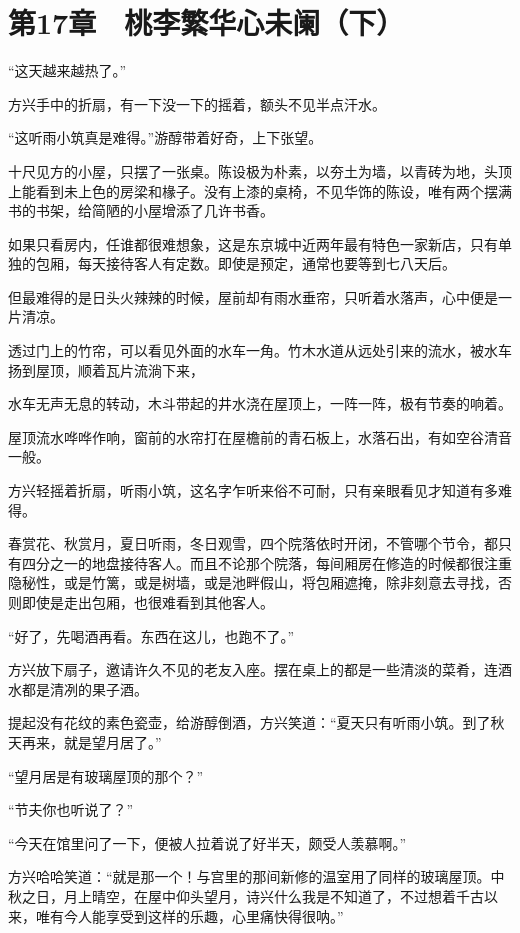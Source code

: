 \section{第17章　桃李繁华心未阑（下）}

“这天越来越热了。”

方兴手中的折扇，有一下没一下的摇着，额头不见半点汗水。

“这听雨小筑真是难得。”游醇带着好奇，上下张望。

十尺见方的小屋，只摆了一张桌。陈设极为朴素，以夯土为墙，以青砖为地，头顶上能看到未上色的房梁和椽子。没有上漆的桌椅，不见华饰的陈设，唯有两个摆满书的书架，给简陋的小屋增添了几许书香。

如果只看房内，任谁都很难想象，这是东京城中近两年最有特色一家新店，只有单独的包厢，每天接待客人有定数。即使是预定，通常也要等到七八天后。

但最难得的是日头火辣辣的时候，屋前却有雨水垂帘，只听着水落声，心中便是一片清凉。

透过门上的竹帘，可以看见外面的水车一角。竹木水道从远处引来的流水，被水车扬到屋顶，顺着瓦片流淌下来，

水车无声无息的转动，木斗带起的井水浇在屋顶上，一阵一阵，极有节奏的响着。

屋顶流水哗哗作响，窗前的水帘打在屋檐前的青石板上，水落石出，有如空谷清音一般。

方兴轻摇着折扇，听雨小筑，这名字乍听来俗不可耐，只有亲眼看见才知道有多难得。

春赏花、秋赏月，夏日听雨，冬日观雪，四个院落依时开闭，不管哪个节令，都只有四分之一的地盘接待客人。而且不论那个院落，每间厢房在修造的时候都很注重隐秘性，或是竹篱，或是树墙，或是池畔假山，将包厢遮掩，除非刻意去寻找，否则即使是走出包厢，也很难看到其他客人。

“好了，先喝酒再看。东西在这儿，也跑不了。”

方兴放下扇子，邀请许久不见的老友入座。摆在桌上的都是一些清淡的菜肴，连酒水都是清冽的果子酒。

提起没有花纹的素色瓷壶，给游醇倒酒，方兴笑道：“夏天只有听雨小筑。到了秋天再来，就是望月居了。”

“望月居是有玻璃屋顶的那个？”

“节夫你也听说了？”

“今天在馆里问了一下，便被人拉着说了好半天，颇受人羡慕啊。”

方兴哈哈笑道：“就是那一个！与宫里的那间新修的温室用了同样的玻璃屋顶。中秋之日，月上晴空，在屋中仰头望月，诗兴什么我是不知道了，不过想着千古以来，唯有今人能享受到这样的乐趣，心里痛快得很呐。”

